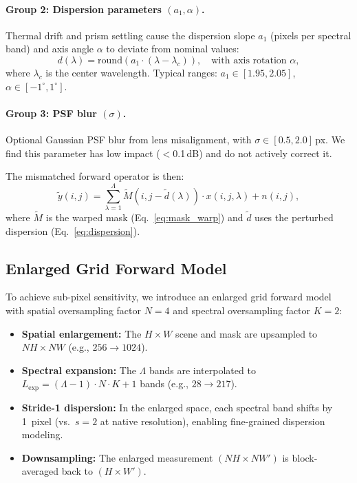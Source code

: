 \documentclass[runningheads]{llncs}
\begin{document}
\paragraph{Group 2: Dispersion parameters $(a_1, \alpha)$.}
Thermal drift and prism settling cause the dispersion slope $a_1$ (pixels per spectral band) and axis angle $\alpha$ to deviate from nominal values:
\begin{equation}
    d(\lambda) = \text{round}(a_1 \cdot (\lambda - \lambda_c)), \quad \text{with axis rotation } \alpha,
    \label{eq:dispersion}
\end{equation}
where $\lambda_c$ is the center wavelength.
Typical ranges: $a_1 \in [1.95, 2.05]$, $\alpha \in [-1^\circ, 1^\circ]$.

\paragraph{Group 3: PSF blur $(\sigma)$.}
Optional Gaussian PSF blur from lens misalignment, with $\sigma \in [0.5, 2.0]$\,px.
We find this parameter has low impact ($<$0.1\,dB) and do not actively correct it.

The mismatched forward operator is then:
\begin{equation}
    \tilde{y}(i, j) = \sum_{\lambda=1}^{\Lambda} \tilde{M}(i, j - \tilde{d}(\lambda)) \cdot x(i, j, \lambda) + n(i, j),
\end{equation}
where $\tilde{M}$ is the warped mask (Eq.~\ref{eq:mask_warp}) and $\tilde{d}$ uses the perturbed dispersion (Eq.~\ref{eq:dispersion}).

\subsection{Enlarged Grid Forward Model}
\label{sec:enlarged}

To achieve sub-pixel sensitivity, we introduce an enlarged grid forward model with spatial oversampling factor $N\!=\!4$ and spectral oversampling factor $K\!=\!2$:
\begin{itemize}
    \item \textbf{Spatial enlargement:} The $H \times W$ scene and mask are upsampled to $NH \times NW$ (e.g., $256 \to 1024$).
    \item \textbf{Spectral expansion:} The $\Lambda$ bands are interpolated to $L_{\text{exp}} = (\Lambda-1) \cdot N \cdot K + 1$ bands (e.g., $28 \to 217$).
    \item \textbf{Stride-1 dispersion:} In the enlarged space, each spectral band shifts by 1~pixel (vs.\ $s\!=\!2$ at native resolution), enabling fine-grained dispersion modeling.
    \item \textbf{Downsampling:} The enlarged measurement $(NH \times NW')$ is block-averaged back to $(H \times W')$.
\end{itemize}
\end{document}
